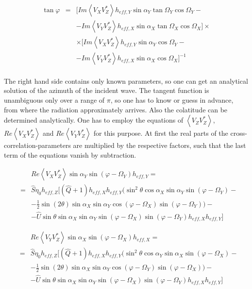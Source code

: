 \documentclass[a4paper,10pt]{thesis}
\begin{document}
\begin{eqnarray}\label{tan_phi}
\tan \varphi &=& [Im \left\langle V_X V_Z^{*}\right\rangle h_{eff,Y} \sin \alpha_Y \tan \Omega_Y \cos \Omega_Y-\\
& & -Im \left\langle V_Y V_Z^{*}\right\rangle h_{eff,X} \sin \alpha_X \tan \Omega_X \cos \Omega_X] \times \nonumber \\
& &\times[Im \left\langle V_X V_Z^{*}\right\rangle h_{eff,Y} \sin \alpha_Y \cos \Omega_Y -\nonumber \\
& &  -Im \left\langle V_Y V_Z^{*}\right\rangle h_{eff,X} \sin \alpha_X  \cos \Omega_X]^{-1}\nonumber
\end{eqnarray}

\paragraph*{}
The right hand side contains only known parameters, so one can get an analytical solution of the azimuth of the incident wave. The tangent function is unambiguous only over a range of $\pi$, so one has to know or guess in advance, from where the radiation approximately arrives. Also the colatitude can be determined analytically. One has to employ the equations of $\left\langle V_Z V_Z^{*} \right\rangle$, $Re \left\langle V_X V_Z^{*}\right\rangle$ and $Re \left\langle V_Y V_Z^{*}\right\rangle$ for this purpose. At first the real parts of the cross-correlation-parameters are multiplied by the respective factors, such that the last term of the equations vanish by subtraction.

\begin{eqnarray}
&&Re \left\langle V_X V_Z^{*}\right\rangle \sin \alpha_Y  \sin (\varphi - \Omega_Y)h_{eff,Y} = \\
&=& \hat{S}\eta_0  h_{eff,Z}[(\hat{Q}+1) h_{eff,X} h_{eff,Y}
(\sin^2 \theta \cos \alpha_X  \sin \alpha_Y  \sin (\varphi - \Omega_Y) - \nonumber \\
&& - \frac{1}{2}  \sin(2\theta) \sin \alpha_X  \sin \alpha_Y \cos(\varphi - \Omega_X)  \sin (\varphi - \Omega_Y) )  - \nonumber \\
&& -\hat{U} \sin \theta \sin \alpha_X  \sin \alpha_Y  \sin (\varphi - \Omega_X)  \sin (\varphi - \Omega_Y) h_{eff,X} h_{eff,Y}  ] \nonumber
\end{eqnarray}

\begin{eqnarray}
&&Re \left\langle V_Y V_Z^{*}\right\rangle\sin \alpha_X  \sin (\varphi - \Omega_X) h_{eff,X}=  \\
&=& \hat{S}\eta_0 h_{eff,Z}[(\hat{Q}+1)h_{eff,X} h_{eff,Y}  (\sin^2 \theta \cos \alpha_Y \sin \alpha_X  \sin (\varphi - \Omega_X) -\nonumber \\
&& - \frac{1}{2}  \sin(2\theta) \sin \alpha_X \sin \alpha_Y  \cos(\varphi - \Omega_Y)  \sin (\varphi - \Omega_X))  - \nonumber \\
&& -\hat{U} \sin \theta \sin \alpha_X \sin \alpha_Y  \sin (\varphi - \Omega_X) \sin (\varphi - \Omega_Y) h_{eff,X} h_{eff,Y}    ]\nonumber
\end{eqnarray}
\end{document}

